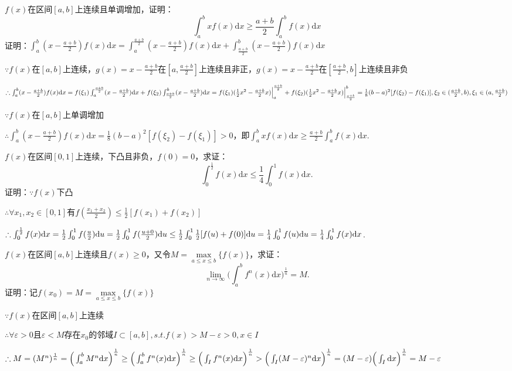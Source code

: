 \documentclass[12pt,UTF8]{ctexart}
\begin{document}
\begin{enumerate}
$f(x)$在区间$[a,b]$上连续且单调增加，证明：
\[
\int_a^bxf(x)\mathrm dx\geq\frac{a+b}2\int_a^bf(x)\mathrm dx
\]
证明：$\int_a^b(x-\frac{a+b}2)f(x)\mathrm dx=\int_a^{\frac{a+b}2}(x-\frac{a+b}2)f(x)\mathrm dx+\int_{\frac{a+b}2}^b(x-\frac{a+b}2)f(x)\mathrm dx$

$\because f(x)$在$[a,b]$上连续，$g(x)=x-\frac{a+b}2$在$[a,\frac{a+b}2]$上连续且非正，$g(x)=x-\frac{a+b}2$在$[\frac{a+b}2,b]$上连续且非负

$\therefore\int_a^b(x-\frac{a+b}2)f(x)\mathrm dx=f(\xi_1)\int_a^{\frac{a+b}2}(x-\frac{a+b}2)\mathrm dx+f(\xi_2)\int_{\frac{a+b}2}^b(x-\frac{a+b}2)\mathrm dx\\
=f(\xi_1)(\frac12x^2-\frac{a+b}2x)\Big|_a^{\frac{a+b}2}+f(\xi_2)(\frac12x^2-\frac{a+b}2x)\Big|_{\frac{a+b}2}^b\\
=\frac18(b-a)^2[f(\xi_2)-f(\xi_1)],\xi_2\in(\frac{a+b}2,b),\xi_1\in(a,\frac{a+b}2)$

$\because f(x)$在$[a,b]$上单调增加

$\therefore\int_a^b(x-\frac{a+b}2)f(x)\mathrm dx=\frac18(b-a)^2[f(\xi_2)-f(\xi_1)]>0$，即$\int_a^bxf(x)\mathrm dx\geq\frac{a+b}2\int_a^bf(x)\mathrm dx$.

$f(x)$在区间$[0,1]$上连续，下凸且非负，$f(0)=0$，求证：
\[
\int_0^{\frac12}f(x)\mathrm dx\leq\frac14\int_0^1f(x)\mathrm dx.
\]
证明：$\because f(x)$下凸

$\therefore\forall x_1,x_2\in[0,1]$有$f(\frac{x_1+x_2}2)\leq\frac12[f(x_1)+f(x_2)]$

$\therefore\int_0^{\frac12}f(x)\mathrm dx=\frac12\int_0^1f(\frac u2)\mathrm du=\frac12\int_0^1f(\frac{u+0}2)\mathrm du\leq\frac12\int_0^1\frac12[f(u)+f(0)]\mathrm du=\frac14\int_0^1f(u)\mathrm du\\
=\frac14\int_0^1f(x)\mathrm dx$.

$f(x)$在区间$[a,b]$上连续且$f(x)\geq0$，又令$M=\max\limits_{a\leq x\leq b}\{f(x)\}$，求证：
\[
\lim\limits_{n\rightarrow\infty}\Big(\int_a^bf^n(x)\mathrm dx\Big)^{\frac1n}=M.
\]
证明：记$f(x_0)=M=\max\limits_{a\leq x\leq b}\{f(x)\}$

$\because f(x)$在区间$[a,b]$上连续

$\therefore\forall\varepsilon>0$且$\varepsilon<M$存在$x_0$的邻域$I\subset[a,b],s.t.f(x)>M-\varepsilon>0,x\in I$

$\therefore M=(M^n)^{\frac1n}=\Big(\int_a^bM^n\mathrm dx\Big)^{\frac1n}\geq\Big(\int_a^bf^n(x)\mathrm dx\Big)^{\frac1n}\geq\Big(\int_If^n(x)\mathrm dx\Big)^{\frac1n}\\
>\Big(\int_I(M-\varepsilon)^n\mathrm dx\Big)^{\frac1n}=(M-\varepsilon)\Big(\int_I\mathrm dx\Big)^{\frac1n}=M-\varepsilon$


\end{enumerate}
\end{document}
